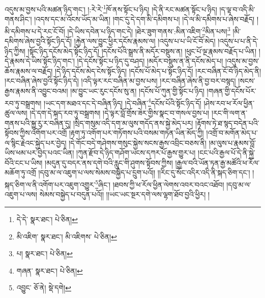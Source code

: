 འདུས་མ་བྱས་པའི་མཚན་ཉིད་གང་། །:རེ་རེ་\footnote{དེ་དེ་  སྣར་ཐང་།  པེ་ཅིན། }ཁོ་ནས་སྟོང་པ་ཉིད། །དེ་ནི་རང་མཚན་སྟོང་པ་ཉིད། །ད་ལྟ་བ་འདི་མི་གནས་ཤིང་། །འདས་དང་མ་འོངས་ཡོད་མ་ཡིན། །གང་དུ་དེ་དག་མི་དམིགས་པ། །དེ་ལ་མི་དམིགས་པ་ཞེས་བརྗོད། །མི་དམིགས་པ་དེ་རང་ངོ་བོ། །དེ་ཡིས་དབེན་པ་ཉིད་གང་དེ། །ཐེར་ཟུག་གནས་:མིན་འཇིག་\footnote{མི་འཇིག་  སྣར་ཐང་། མི་འཇིགས་  པེ་ཅིན། }མིན་པས།\footnote{པ།  སྣར་ཐང་།  པེ་ཅིན། } །མི་དམིགས་ཞེས་བྱའི་སྟོང་ཉིད་དོ། །རྐྱེན་ལས་བྱུང་ཕྱིར་དངོས་རྣམས་ལ། །འདུས་པ་པ་ཡི་ངོ་བོ་མེད། །འདུས་པ་པ་ནི་དེ་ཉིད་ཀྱིས། །སྟོང་ཉིད་དངོས་མེད་སྟོང་ཉིད་དོ། །དངོས་པོའི་སྒྲས་ནི་མདོར་བསྡུས་ན། །ཕུང་པོ་ལྔ་རྣམས་བརྗོད་པ་ཡིན། །དེ་རྣམས་དེ་ཡིས་སྟོང་ཉིད་གང་། །དེ་དངོས་སྟོང་པ་ཉིད་དུ་བཤད། །མདོར་བསྡུས་ན་ནི་དངོས་མེད་པ། །འདུས་མ་བྱས་ཆོས་རྣམས་ལ་བརྗོད། །དེ་ཉིད་དངོས་མེད་ངེས་སྟོང་ཉིད། །དངོས་པོ་མེད་པ་སྟོང་ཉིད་དོ། །རང་བཞིན་ངོ་བོ་ཉིད་མེད་ནི། །རང་བཞིན་ཞེས་བྱའི་སྟོང་ཉིད་དེ། །འདི་ལྟར་རང་བཞིན་མ་བྱས་པས། །རང་བཞིན་ཞེས་ནི་བྱ་བར་བསྙད། །སངས་རྒྱས་རྣམས་ནི་འབྱུང་བའམ། །མ་བྱུང་ཡང་རུང་དངོས་སུ་ན། །དངོས་པོ་ཀུན་གྱི་སྟོང་པ་ཉིད། །གཞན་གྱི་དངོས་པོར་རབ་ཏུ་བསྒྲགས། །ཡང་དག་མཐའ་དང་དེ་བཞིན་ཉིད། །དེ་བཞིན་\footnote{གཞན་  སྣར་ཐང་།  པེ་ཅིན། }དངོས་པོའི་སྟོང་ཉིད་དོ། །ཤེས་རབ་ཕ་རོལ་ཕྱིན་ཚུལ་ལས། །དེ་དག་དེ་སྐད་རབ་ཏུ་བསྒྲགས། །དེ་ལྟར་བློ་གྲོས་ཟེར་གྱིས་སྣང་བ་གསལ་བྱས་པ། །རང་གི་ལག་ན་གནས་པའི་སྐྱུ་རུ་ར་བཞིན་དུ། །སྲིད་གསུམ་འདི་དག་མ་ལུས་གདོད་ནས་སྐྱེ་མེད་པར། །རྟོགས་ཏེ་ཐ་སྙད་བདེན་པའི་སྟོབས་ཀྱིས་འགོག་པར་འགྲོ །རྟག་ཏུ་འགོག་པར་གཏོགས་པའི་བསམ་གཏན་ཡིན་མོད་ཀྱི། །འགྲོ་བ་མགོན་མེད་པ་ལ་སྙིང་རྗེའང་སྐྱེད་པར་བྱེད། །དེ་གོང་བདེ་གཤེགས་གསུང་སྐྱེས་སངས་རྒྱས་འབྲིང་བཅས་ནི། །མ་ལུས་པ་རྣམས་བློ་ཡིས་ཕམ་པར་བྱེད་པའང་ཡིན། །ཀུན་རྫོབ་དེ་ཉིད་གཤོག་ཡངས་དཀར་པོ་རྒྱས་གྱུར་པ། །ངང་པའི་རྒྱལ་པོ་དེ་ནི་སྐྱེ་བོའི་ངང་པ་ཡིས། །མདུན་དུ་བདར་ནས་དགེ་བའི་རླུང་གི་ཤུགས་སྟོབས་ཀྱིས། །རྒྱལ་བའི་ཡོན་ཏན་རྒྱ་མཚོའི་ཕ་རོལ་མཆོག་ཏུ་འགྲོ །དབུ་མ་ལ་འཇུག་པ་ལས་སེམས་བསྐྱེད་པ་དྲུག་པའོ།། །།རིང་དུ་སོང་འདིར་འདི་ནི་སྐད་ཅིག་དང་། །སྐད་ཅིག་ལ་ནི་འགོག་པར་འཇུག་འགྱུར་\footnote{འབྱུང་  ཅོ་ནེ།  སྡེ་དགེ། }ཞིང་། །ཐབས་ཀྱི་ཕ་རོལ་ཕྱིན་ལེགས་འབར་བའང་འཐོབ། །དབུ་མ་ལ་འཇུག་པ་ལས། སེམས་བསྐྱེད་པ་བདུན་པའོ།། །།ཡང་ཡང་སྔར་དགེ་ལས་ལྷག་ཐོབ་བྱའི་ཕྱིར། །
